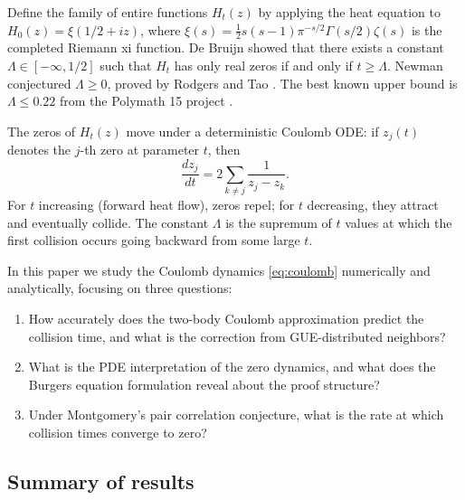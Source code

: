 \documentclass[11pt,a4paper]{article}
\begin{document}
Define the family of entire functions $H_t(z)$ by applying the heat
equation to $H_0(z) = \xi(1/2 + iz)$, where $\xi(s) = \frac{1}{2}
s(s-1)\pi^{-s/2}\Gamma(s/2)\zeta(s)$ is the completed Riemann xi
function. De Bruijn \cite{debruijn1950} showed that there exists a
constant $\Lambda \in [-\infty, 1/2]$ such that $H_t$ has only real
zeros if and only if $t \geq \Lambda$. Newman \cite{newman1976}
conjectured $\Lambda \geq 0$, proved by Rodgers and Tao
\cite{rodgers2020}. The best known upper bound is $\Lambda \leq 0.22$
from the Polymath 15 project \cite{polymath2019}.

The zeros of $H_t(z)$ move under a deterministic Coulomb ODE: if
$z_j(t)$ denotes the $j$-th zero at parameter $t$, then
\begin{equation}\label{eq:coulomb}
  \frac{dz_j}{dt} = 2\sum_{k \neq j} \frac{1}{z_j - z_k}.
\end{equation}
For $t$ increasing (forward heat flow), zeros repel; for $t$
decreasing, they attract and eventually collide. The constant
$\Lambda$ is the supremum of $t$ values at which the first collision
occurs going backward from some large $t$.

In this paper we study the Coulomb dynamics \eqref{eq:coulomb}
numerically and analytically, focusing on three questions:
\begin{enumerate}[label=(\roman*)]
  \item How accurately does the two-body Coulomb approximation predict
    the collision time, and what is the correction from GUE-distributed
    neighbors?
  \item What is the PDE interpretation of the zero dynamics, and what
    does the Burgers equation formulation reveal about the proof
    structure?
  \item Under Montgomery's pair correlation conjecture, what is the
    rate at which collision times converge to zero?
\end{enumerate}

\subsection{Summary of results}
\end{document}
